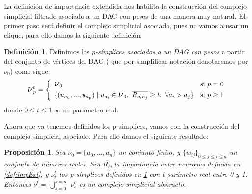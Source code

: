 \documentclass[12pt, a4paper, twoside]{book}
\numberwithin{equation}{section}
\theoremstyle{definition}
\newtheorem{defi}{Definición}[section]
\theoremstyle{remark}
\theoremstyle{plain}
\newtheorem{prop}{Proposición}
\begin{document}
	La definición de importancia extendida nos habilita la construcción 
	del complejo simplicial filtrado asociado a un DAG con pesos de una 
	manera muy natural. El primer paso será definir el complejo 
	simplicial asociado, pues no vamos a usar un clique, para ello damos 
	la siguiente definición: 
	\begin{defi}
		\label{def:SimpAut}
		Definimos los \textit{$p$-símplices asociados a un DAG con pesos} a partir del conjunto de vértices del DAG ( que
		por simplificar notación denotaremos por {\Large $\nu$}$_{0}$) 
		como sigue:
	\begin{equation*}
		\text{{\Large $\nu$}}_{p}^{t}=
		\left \{
			\begin{array}{ll}
				\text{{\Large $\nu$}}_{0} & \text{si } p=0\\[3pt]
				\{(u_{a_{0}},...,u_{a_{p}}) \mid u_{a_{i}} \in 
					\text{{\Large $\nu$}}_{0},\ 
					\overline{R_{a_{i}a_{j}}} \geq t,\ 
				\forall a_{i} > a_{j} \} & \text{si } p \geq 1
			\end{array}
		\right.  
	\end{equation*}
	donde $0 \leq t \leq 1$ es un parámetro real.
	\end{defi}
	Ahora que ya tenemos definidos los p-símplices, vamos con la 
	construcción del complejo simplicial asociado. Para ello damos el 
	siguiente resultado:
	\begin{prop}
		Sea {\Large $\nu$}$_{0}=\{u_{0},...,u_{n}\}$ un conjunto 
		finito, y $\{w_{ij}\}_{0\leq j \leq i \leq n}$ un 
		conjunto de números reales. Sea $\overline{R_{ij}}$ la 
		importancia entre neuronas definida en \ref{def:impExt}, y 
		{\Large $\nu$}$_{p}^{t}$ los p-símplices definidos en 
		\ref{def:SimpAut} con t parámetro real entre 0 y 1. Entonces 
		{\Large $\nu$}$^{t}=\bigcup_{s=0}^{s=n}$
		{\Large $\nu$}$_{s}^{t}$ 
		es un complejo simplicial abstracto. 
		\label{prop:cs}
	\end{prop}
\end{document}
